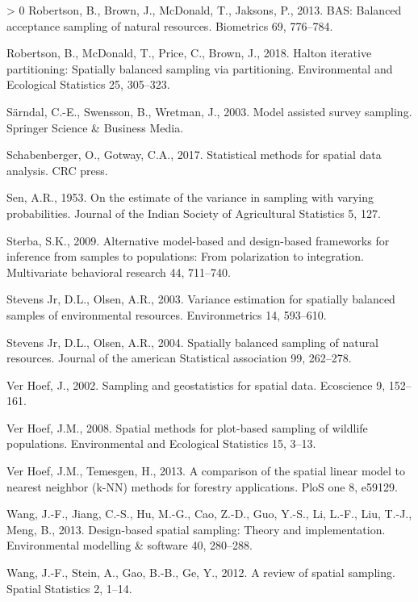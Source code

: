 \documentclass[]{elsarticle} %
\newlength{\cslhangindent}
\newenvironment{CSLReferences}[3] %
 {%
  \setlength{\parindent}{0pt}
  \ifodd #1 \everypar{\setlength{\hangindent}{\cslhangindent}}\ignorespaces\fi
  \ifnum #2 > 0
  \setlength{\parskip}{#2\baselineskip}
  \fi
 }%
 {}
\begin{document}
\begin{CSLReferences}{1}{0}
\leavevmode\hypertarget{ref-robertson2013bas}{}%
Robertson, B., Brown, J., McDonald, T., Jaksons, P., 2013. BAS: Balanced
acceptance sampling of natural resources. Biometrics 69, 776--784.

\leavevmode\hypertarget{ref-robertson2018halton}{}%
Robertson, B., McDonald, T., Price, C., Brown, J., 2018. Halton
iterative partitioning: Spatially balanced sampling via partitioning.
Environmental and Ecological Statistics 25, 305--323.

\leavevmode\hypertarget{ref-sarndal2003model}{}%
Särndal, C.-E., Swensson, B., Wretman, J., 2003. Model assisted survey
sampling. Springer Science \& Business Media.

\leavevmode\hypertarget{ref-schabenberger2017statistical}{}%
Schabenberger, O., Gotway, C.A., 2017. Statistical methods for spatial
data analysis. CRC press.

\leavevmode\hypertarget{ref-sen1953estimate}{}%
Sen, A.R., 1953. On the estimate of the variance in sampling with
varying probabilities. Journal of the Indian Society of Agricultural
Statistics 5, 127.

\leavevmode\hypertarget{ref-sterba2009alternative}{}%
Sterba, S.K., 2009. Alternative model-based and design-based frameworks
for inference from samples to populations: From polarization to
integration. Multivariate behavioral research 44, 711--740.

\leavevmode\hypertarget{ref-stevens2003variance}{}%
Stevens Jr, D.L., Olsen, A.R., 2003. Variance estimation for spatially
balanced samples of environmental resources. Environmetrics 14,
593--610.

\leavevmode\hypertarget{ref-stevens2004spatially}{}%
Stevens Jr, D.L., Olsen, A.R., 2004. Spatially balanced sampling of
natural resources. Journal of the american Statistical association 99,
262--278.

\leavevmode\hypertarget{ref-verhoef2002sampling}{}%
Ver Hoef, J., 2002. Sampling and geostatistics for spatial data.
Ecoscience 9, 152--161.

\leavevmode\hypertarget{ref-verhoef2008spatial}{}%
Ver Hoef, J.M., 2008. Spatial methods for plot-based sampling of
wildlife populations. Environmental and Ecological Statistics 15, 3--13.

\leavevmode\hypertarget{ref-ver2013comparison}{}%
Ver Hoef, J.M., Temesgen, H., 2013. A comparison of the spatial linear
model to nearest neighbor (k-NN) methods for forestry applications. PloS
one 8, e59129.

\leavevmode\hypertarget{ref-wang2013design}{}%
Wang, J.-F., Jiang, C.-S., Hu, M.-G., Cao, Z.-D., Guo, Y.-S., Li, L.-F.,
Liu, T.-J., Meng, B., 2013. Design-based spatial sampling: Theory and
implementation. Environmental modelling \& software 40, 280--288.

\leavevmode\hypertarget{ref-wang2012review}{}%
Wang, J.-F., Stein, A., Gao, B.-B., Ge, Y., 2012. A review of spatial
sampling. Spatial Statistics 2, 1--14.

\end{CSLReferences}
\end{document}
